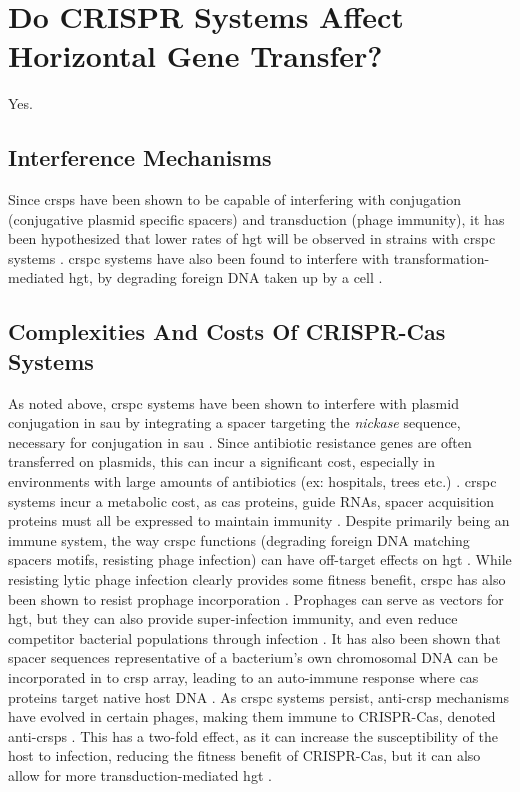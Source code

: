\section*{Do CRISPR Systems Affect Horizontal Gene Transfer?}
Yes.
\subsection*{Interference Mechanisms}
Since \ac{crsp}s have been shown to be capable of interfering with conjugation (conjugative plasmid specific spacers) and transduction (phage immunity), it has been hypothesized that lower rates of \ac{hgt} will be observed in strains with \ac{crspc} systems \citep{staphlim}.
\ac{crspc} systems have also been found to interfere with transformation-mediated \ac{hgt}, by degrading foreign DNA taken up by a cell \citep{climtrans}.
\subsection*{Complexities And Costs Of CRISPR-Cas Systems}
As noted above, \ac{crspc} systems have been shown to interfere with plasmid conjugation in \ac{sau} by integrating a spacer targeting the \textit{nickase} sequence, necessary for conjugation in \ac{sau} \citep{staphlim}.
Since antibiotic resistance genes are often transferred on plasmids, this can incur a significant cost, especially in environments with large amounts of antibiotics (ex: hospitals, trees etc.) \citep{hospital}.
\ac{crspc} systems incur a metabolic cost, as \ac{cas} proteins, guide RNAs, spacer acquisition proteins must all be expressed to maintain immunity \citep{crispgen}.
Despite primarily being an immune system, the way \ac{crspc} functions (degrading foreign DNA matching spacers motifs, resisting phage infection) can have off-target effects on \ac{hgt} \citep{acqorres}.
While resisting lytic phage infection clearly provides some fitness benefit, \ac{crspc} has also been shown to resist prophage incorporation \citep{acqorres}.
Prophages can serve as vectors for \ac{hgt}, but they can also provide super-infection immunity, and even reduce competitor bacterial populations through infection \citep{acqorres,transhgt}.
It has also been shown that spacer sequences representative of a bacterium's own chromosomal DNA can be incorporated in to \ac{crsp} array, leading to an auto-immune response where \ac{cas} proteins target native host DNA \citep{selfcrisp}.
As \ac{crspc} systems persist, anti-\ac{crsp} mechanisms have evolved in certain phages, making them immune to CRISPR-Cas, denoted anti-\ac{crsp}s \citep{acqorres}.
This has a two-fold effect, as it can increase the susceptibility of the host to infection, reducing the fitness benefit of CRISPR-Cas, but it can also allow for more transduction-mediated \ac{hgt} \citep{acqorres}.
